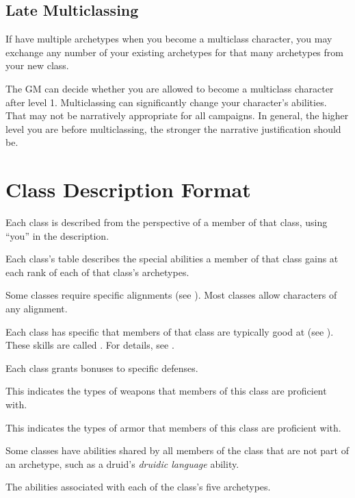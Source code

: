   \subsection{Late Multiclassing}
    If have multiple archetypes when you become a multiclass character, you may exchange any number of your existing archetypes for that many archetypes from your new class.

    The GM can decide whether you are allowed to become a multiclass character after level 1.
    Multiclassing can significantly change your character's abilities.
    That may not be narratively appropriate for all campaigns.
    In general, the higher level you are before multiclassing, the stronger the narrative justification should be.

\section{Class Description Format}
  Each class is described from the perspective of a member of that class, using ``you'' in the description.

  Each class's table describes the special abilities a member of that class gains at each rank of each of that class's archetypes.

  Some classes require specific alignments (see ).
  Most classes allow characters of any alignment.

  Each class has specific  that members of that class are typically good at (see ).
  These skills are called .
  For details, see .

  Each class grants bonuses to specific defenses.

  This indicates the types of weapons that members of this class are proficient with.

  This indicates the types of armor that members of this class are proficient with.

  Some classes have abilities shared by all members of the class that are not part of an archetype, such as a druid's \textit{druidic language} ability.

  The abilities associated with each of the class's five archetypes.

  

